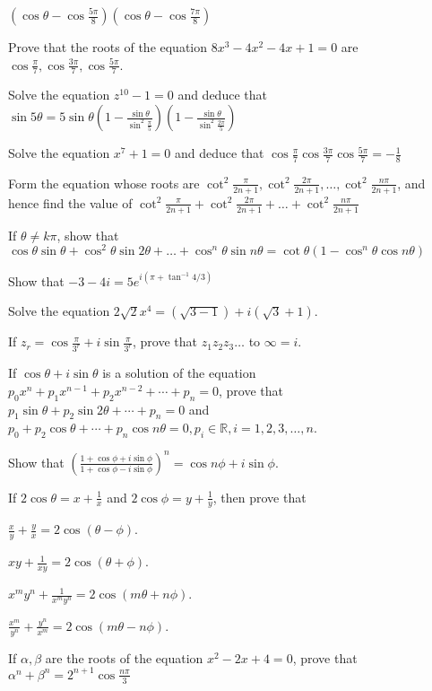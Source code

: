   $\left(\cos\theta - \cos\frac{5\pi}{8}\right)\left(\cos\theta - \cos\frac{7\pi}{8}\right)$
\item Prove that the roots of the equation $8x^3 - 4x^2 - 4x + 1= 0$ are $\cos\frac{\pi}{7}, \cos\frac{3\pi}{7},
  \cos\frac{5\pi}{7}$.
\item Solve the equation $z^{10} - 1 = 0$ and deduce that $\sin5\theta = 5\sin\theta\left(1 -
  \frac{\sin\theta}{\sin^2\frac{\pi}{5}}\right)\left(1 - \frac{\sin\theta}{\sin^2\frac{2\pi}{5}}\right)$
\item Solve the equation $x^7 +1 = 0$ and deduce that $\cos\frac{\pi}{7}\cos\frac{3\pi}{7}\cos\frac{5\pi}{7} = -\frac{1}{8}$
\item Form the equation whose roots are $\cot^2\frac{\pi}{2n + 1}, \cot^2\frac{2\pi}{2n + 1}, \ldots, \cot^2\frac{n\pi}{2n + 1}$,
  and hence find the value of $\cot^2\frac{\pi}{2n + 1} + \cot^2\frac{2\pi}{2n + 1} + \ldots + \cot^2\frac{n\pi}{2n + 1}$
\item If $\theta \neq k\pi$, show that $\cos\theta\sin\theta + \cos^2\theta\sin2\theta + \ldots + \cos^n\theta\sin n\theta =
  \cot\theta(1 - \cos^n\theta\cos n\theta)$
\item Show that $-3 - 4i = 5e^{i(\pi + \tan^{-1}4/3)}$
\item Solve the equation $2\sqrt{2}x^4 = (\sqrt{3 - 1}) + i(\sqrt{3} + 1)$.
\item If $z_r = \cos\frac{\pi}{3^r} + i\sin\frac{\pi}{3^r}$, prove that $z_1z_2z_3\ldots$ to $\infty = i$.
\item If $\cos\theta + i\sin\theta$ is a solution of the equation $p_0x^n + p_1x^{n - 1} + p_2x^{n - 2} +
  \cdots + p_n = 0$, prove that $p_1\sin\theta + p_2\sin2\theta + \cdots + p_n = 0$ and $p_0 + p_2\cos\theta
  + \cdots + p_n\cos n\theta = 0, p_i\in\mathbb{R}, i=1, 2, 3, \ldots, n$.
\item Show that $\left(\frac{1 + \cos\phi + i\sin\phi}{1 + \cos\phi - i\sin\phi}\right)^n = \cos n\phi + i\sin\phi$.
\item If $2\cos\theta = x + \frac{1}{x}$ and $2\cos\phi = y + \frac{1}{y}$, then prove that
  \startitemize[i]
  \item $\frac{x}{y} + \frac{y}{x} = 2\cos(\theta - \phi)$.
  \item $xy + \frac{1}{xy} = 2\cos(\theta + \phi)$.
  \item $x^my^n + \frac{1}{x^my^n} = 2\cos(m\theta + n\phi)$.
  \item $\frac{x^m}{y^n} + \frac{y^n}{x^m} = 2\cos(m\theta - n\phi)$.
  \stopitemize
\item If $\alpha, \beta$ are the roots of the equation $x^2 - 2x + 4 = 0$, prove that $\alpha^n + \beta^n = 2^{n +
  1}\cos\frac{n\pi}{3}$
